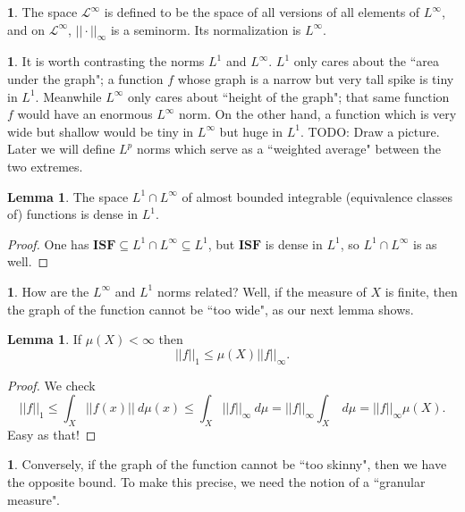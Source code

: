 \documentclass[12pt]{book}
\newcommand{\ISF}{\mathbf{ISF}}
\theoremstyle{definition}
\newtheorem{lemma}[theorem]{Lemma}
\newtheorem{subsec}[theorem]{}
\begin{document}
\begin{subsec}
The space $\mathcal L^\infty$ is defined to be the space of all versions of all elements of $L^\infty$, and on $\mathcal L^\infty$, $||\cdot||_\infty$ is a seminorm. Its normalization is $L^\infty$.
\end{subsec}

\begin{subsec}
It is worth contrasting the norms $L^1$ and $L^\infty$. $L^1$ only cares about the ``area under the graph"; a function $f$ whose graph is a narrow but very tall spike is tiny in $L^1$. Meanwhile $L^\infty$ only cares about ``height of the graph"; that same function $f$ would have an enormous $L^\infty$ norm.
On the other hand, a function which is very wide but shallow would be tiny in $L^\infty$ but huge in $L^1$. TODO: Draw a picture.
Later we will define $L^p$ norms which serve as a ``weighted average" between the two extremes.
\end{subsec}

\begin{lemma}
The space $L^1 \cap L^\infty$ of almost bounded integrable (equivalence classes of) functions is dense in $L^1$.
\end{lemma}
\begin{proof}
One has $\ISF \subseteq L^1 \cap L^\infty \subseteq L^1$, but $\ISF$ is dense in $L^1$, so $L^1 \cap L^\infty$ is as well.
\end{proof}

\begin{subsec}
How are the $L^\infty$ and $L^1$ norms related?
Well, if the measure of $X$ is finite, then the graph of the function cannot be ``too wide", as our next lemma shows.
\end{subsec}

\begin{lemma}
If $\mu(X) < \infty$ then
$$||f||_1 \leq \mu(X) ||f||_\infty.$$
\end{lemma}
\begin{proof}
We check
$$||f||_1 \leq \int_X ||f(x)||~d\mu(x) \leq \int_X ||f||_\infty ~d\mu = ||f||_\infty \int_X ~d\mu = ||f||_\infty \mu(X).$$
Easy as that!
\end{proof}

\begin{subsec}
Conversely, if the graph of the function cannot be ``too skinny", then we have the opposite bound.
To make this precise, we need the notion of a ``granular measure".
\end{subsec}
\end{document}

